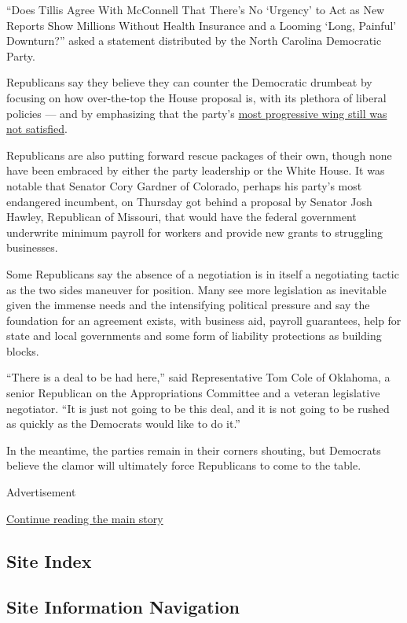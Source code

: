 ``Does Tillis Agree With McConnell That There's No `Urgency' to Act as
New Reports Show Millions Without Health Insurance and a Looming `Long,
Painful' Downturn?'' asked a statement distributed by the North Carolina
Democratic Party.

Republicans say they believe they can counter the Democratic drumbeat by
focusing on how over-the-top the House proposal is, with its plethora of
liberal policies --- and by emphasizing that the party's
\href{https://www.nytimes.com/2020/05/14/us/politics/coronavirus-workers-income-lawmakers.html}{most
progressive wing still was not satisfied}.

Republicans are also putting forward rescue packages of their own,
though none have been embraced by either the party leadership or the
White House. It was notable that Senator Cory Gardner of Colorado,
perhaps his party's most endangered incumbent, on Thursday got behind a
proposal by Senator Josh Hawley, Republican of Missouri, that would have
the federal government underwrite minimum payroll for workers and
provide new grants to struggling businesses.

Some Republicans say the absence of a negotiation is in itself a
negotiating tactic as the two sides maneuver for position. Many see more
legislation as inevitable given the immense needs and the intensifying
political pressure and say the foundation for an agreement exists, with
business aid, payroll guarantees, help for state and local governments
and some form of liability protections as building blocks.

``There is a deal to be had here,'' said Representative Tom Cole of
Oklahoma, a senior Republican on the Appropriations Committee and a
veteran legislative negotiator. ``It is just not going to be this deal,
and it is not going to be rushed as quickly as the Democrats would like
to do it.''

In the meantime, the parties remain in their corners shouting, but
Democrats believe the clamor will ultimately force Republicans to come
to the table.

Advertisement

\protect\hyperlink{after-bottom}{Continue reading the main story}

\hypertarget{site-index}{%
\subsection{Site Index}\label{site-index}}

\hypertarget{site-information-navigation}{%
\subsection{Site Information
Navigation}\label{site-information-navigation}}

